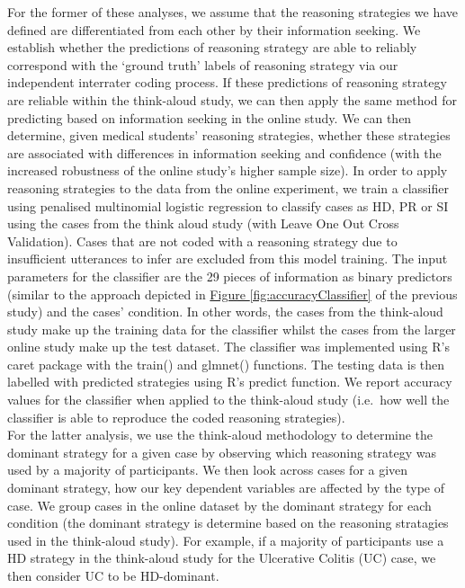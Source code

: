 \documentclass[a4paper, nobind]{templates/ociamthesis}
\begin{document}
For the former of these analyses, we assume that the reasoning strategies we have defined are differentiated from each other by their information seeking. We establish whether the predictions of reasoning strategy are able to reliably correspond with the `ground truth' labels of reasoning strategy via our independent interrater coding process. If these predictions of reasoning strategy are reliable within the think-aloud study, we can then apply the same method for predicting based on information seeking in the online study. We can then determine, given medical students' reasoning strategies, whether these strategies are associated with differences in information seeking and confidence (with the increased robustness of the online study's higher sample size). In order to apply reasoning strategies to the data from the online experiment, we train a classifier using penalised multinomial logistic regression to classify cases as HD, PR or SI using the cases from the think aloud study (with Leave One Out Cross Validation). Cases that are not coded with a reasoning strategy due to insufficient utterances to infer are excluded from this model training. The input parameters for the classifier are the 29 pieces of information as binary predictors (similar to the approach depicted in \hyperref[fig:accuracyClassifier]{Figure \ref{fig:accuracyClassifier}} of the previous study) and the cases' condition. In other words, the cases from the think-aloud study make up the training data for the classifier whilst the cases from the larger online study make up the test dataset. The classifier was implemented using R's caret package with the train() and glmnet() functions. The testing data is then labelled with predicted strategies using R's predict function. We report accuracy values for the classifier when applied to the think-aloud study (i.e.~how well the classifier is able to reproduce the coded reasoning strategies).\\

For the latter analysis, we use the think-aloud methodology to determine the dominant strategy for a given case by observing which reasoning strategy was used by a majority of participants. We then look across cases for a given dominant strategy, how our key dependent variables are affected by the type of case. We group cases in the online dataset by the dominant strategy for each condition (the dominant strategy is determine based on the reasoning stratagies used in the think-aloud study). For example, if a majority of participants use a HD strategy in the think-aloud study for the Ulcerative Colitis (UC) case, we then consider UC to be HD-dominant.
\end{document}
